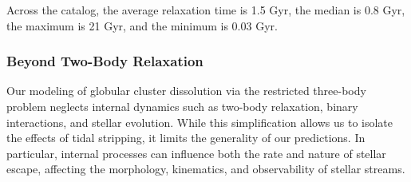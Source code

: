             Across the catalog, the average relaxation time is 1.5 Gyr, the median is 0.8 Gyr, the maximum is 21 Gyr, and the minimum is 0.03 Gyr.
        \subsubsection{Beyond Two-Body Relaxation}
            Our modeling of globular cluster dissolution via the restricted three-body problem neglects internal dynamics such as two-body relaxation, binary interactions, and stellar evolution. While this simplification allows us to isolate the effects of tidal stripping, it limits the generality of our predictions. In particular, internal processes can influence both the rate and nature of stellar escape, affecting the morphology, kinematics, and observability of stellar streams.

